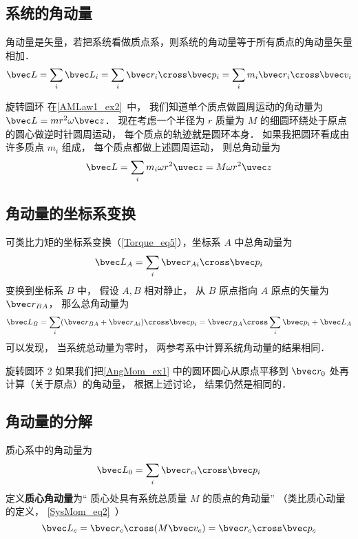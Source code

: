 

\subsection{系统的角动量}
角动量是矢量，若把系统看做质点系，则系统的角动量等于所有质点的角动量矢量相加．
\begin{equation}\label{AngMom_eq1}
\bvec L = \sum_i \bvec L_i = \sum_i \bvec r_i \cross\bvec p_i = \sum_i m_i \bvec r_i \cross\bvec v_i
\end{equation}
\begin{example}{旋转圆环}\label{AngMom_ex1}
在\autoref{AMLaw1_ex2}~中， 我们知道单个质点做圆周运动的角动量为 $\bvec L = m r^2 \omega \bvec z$． 现在考虑一个半径为 $r$ 质量为 $M$ 的细圆环绕处于原点的圆心做逆时针圆周运动， 每个质点的轨迹就是圆环本身． 如果我把圆环看成由许多质点 $m_i$ 组成， 每个质点都做上述圆周运动， 则总角动量为
\begin{equation}
\bvec L = \sum_i m_i \omega r^2 \uvec z = M \omega r^2 \uvec z
\end{equation}
\end{example}

\subsection{角动量的坐标系变换}
可类比力矩的坐标系变换（\autoref{Torque_eq5}），坐标系 $A$ 中总角动量为
\begin{equation}
\bvec L_A = \sum_i \bvec r_{Ai} \cross \bvec p_i 
\end{equation}
变换到坐标系 $B$ 中， 假设 $A, B$ 相对静止， 从 $B$ 原点指向 $A$ 原点的矢量为 $\bvec r_{BA}$， 那么总角动量为
\begin{equation}\label{AngMom_eq4}
\bvec L_B = \sum_i (\bvec r_{BA} + \bvec r_{Ai})\cross \bvec p_i = \bvec r_{BA}\cross \sum_i \bvec p_i + \bvec L_A
\end{equation}
可以发现， 当系统总动量为零时， 两参考系中计算系统角动量的结果相同．

\begin{example}{旋转圆环 2}
如果我们把\autoref{AngMom_ex1} 中的圆环圆心从原点平移到 $\bvec r_0$ 处再计算（关于原点）的角动量， 根据上述讨论， 结果仍然是相同的．
\end{example}

\subsection{角动量的分解}
质心系中的角动量为
\begin{equation}\label{AngMom_eq5}
\bvec L_0 = \sum_i \bvec r_{ci} \cross \bvec p_i
\end{equation}
定义\textbf{质心角动量}为“ 质心处具有系统总质量 $M$ 的质点的角动量” （类比质心动量的定义， \autoref{SysMom_eq2}~）
\begin{equation}\label{AngMom_eq6}
\bvec L_c  = \bvec r_c \cross (M \bvec v_c) = \bvec r_c \cross \bvec p_c
\end{equation}

